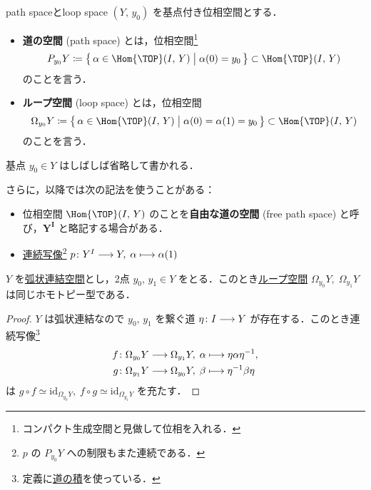 \documentclass[algtopo_main]{subfiles}
\begin{document}
\begin{mydef}[label=def:path-loop]{path spaceとloop space}
    $(Y,\, y_0)$ を基点付き位相空間とする．
    \begin{itemize}
        \item \textbf{道の空間} (path space) とは，位相空間\footnote{コンパクト生成空間と見做して位相を入れる．}
        \begin{align}
            P_{y_0} Y \coloneqq \bigl\{\, \alpha \in \Hom{\TOP}(I,\, Y)\bigm| \alpha(0) = y_0 \,\bigr\} \subset \Hom{\TOP}(I,\, Y)
        \end{align}
        のことを言う．
        \item \textbf{ループ空間} (loop space) とは，位相空間
        \begin{align}
            \Omega_{y_0} Y \coloneqq \bigl\{\, \alpha \in \Hom{\TOP} (I,\, Y) \bigm| \alpha(0) = \alpha(1) = y_0 \,\bigr\} \subset \Hom{\TOP} (I,\, Y)
        \end{align}
        のことを言う．
    \end{itemize}
    
\end{mydef}

\begin{marker}
    基点 $y_0 \in Y$ はしばしば省略して書かれる．
\end{marker}

さらに，以降では次の記法を使うことがある：
\begin{itemize}
    \item 位相空間 $\Hom{\TOP} (I,\, Y)$ のことを\textbf{自由な道の空間} (free path space) と呼び，$\bm{Y^I}$ と略記する場合がある．
    \item \underline{連続写像}\footnote{$p$ の $P_{y_0}Y$ への制限もまた連続である．} $p \colon Y^I \longrightarrow Y,\; \alpha \longmapsto \alpha(1)$
\end{itemize}

\begin{myprop}[]{}
    $Y$ を\underline{弧状連結空間}とし，2点 $y_0,\, y_1 \in Y$ をとる．このとき\hyperref[def:path-loop]{ループ空間} $\Omega_{y_0}Y,\; \Omega_{y_1}Y$ は同じホモトピー型である．
\end{myprop}

\begin{proof}
    $Y$ は弧状連結なので $y_0,\, y_1$ を繋ぐ道 $\eta \colon I \longrightarrow Y$ が存在する．このとき連続写像\footnote{定義に\hyperref[def:path-basic]{道の積}を使っている．}
    \begin{align}
        f &\colon \Omega_{y_0} Y \longrightarrow \Omega_{y_1} Y,\; \alpha \longmapsto \eta \alpha \eta^{-1}, \\
        g &\colon \Omega_{y_1} Y \longrightarrow \Omega_{y_0} Y,\; \beta \longmapsto \eta^{-1} \beta \eta
    \end{align}
    は $g \circ f \simeq \mathrm{id}_{\Omega_{y_0} Y},\; f \circ g \simeq \mathrm{id}_{\Omega_{y_1} Y}$ を充たす．
\end{proof}
\end{document}
